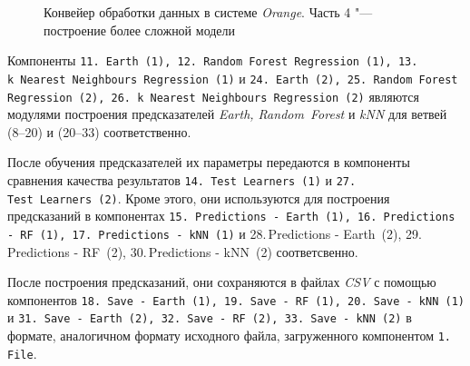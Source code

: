 \begin{figure}
    \caption{Конвейер обработки данных в системе \textit{Orange}. Часть 4 "--- построение более сложной модели}
    \label{img:series30-4}
\end{figure}

Компоненты \texttt{11.\,Earth~(1), 12.\,Random~Forest Regression~(1), 13.\,k~Nearest~Neighbours Regression~(1)} и \texttt{24.\,Earth~(2), 25.~Random~Forest Regression~(2), 26.\,k~Nearest~Neighbours Regression~(2)} являются модулями построения предсказателей \textit{Earth, Random~Forest} и \textit{kNN} для ветвей (8--20) и (20--33) соответственно.

После обучения предсказателей их параметры передаются в компоненты сравнения качества результатов \texttt{14.\,Test~Learners~(1)} и \texttt{27.\,Test~Learners~(2)}. Кроме этого, они используются для построения предсказаний в компонентах \texttt{15.\,Predictions - Earth~(1), 16.\,Predictions - RF~(1), 17.\,Predictions - kNN~(1)} и {28.\,Predictions - Earth~(2), 29.\,Predictions - RF~(2), 30.\,Predictions - kNN~(2)} соответсвенно.

После построения предсказаний, они сохраняются в файлах \textit{CSV} с помощью компонентов \texttt{18.\,Save - Earth~(1), 19.\,Save - RF~(1), 20.\,Save - kNN~(1)} и \texttt{31.\,Save - Earth~(2), 32.\,Save - RF~(2), 33.\,Save - kNN~(2)} в формате, аналогичном формату исходного файла, загруженного компонентом \texttt{1.\,File}.